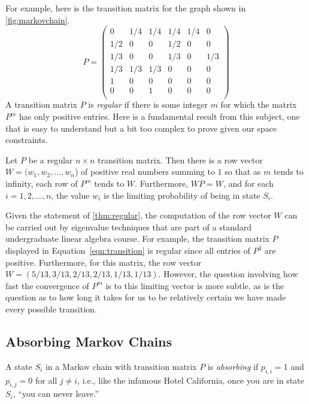 For example, here is the transition matrix for the graph shown in
\autoref{fig:markovchain}.
\begin{equation}\label{eqn:transition}
P =\begin{pmatrix}
      0 & 1/4 & 1/4 & 1/4 & 1/4 &   0 \\
    1/2 &   0 &   0 & 1/2 &   0 &   0 \\
    1/3 &   0 &   0 & 1/3 &   0 & 1/3 \\
    1/3 & 1/3 & 1/3 &   0 &   0 &   0 \\
      1 &   0 &   0 &   0 &   0 &   0 \\
      0 &   0 &   1 &   0 &   0 &   0 \\
   \end{pmatrix}
\end{equation} 
A transition matrix $P$ is \textit{regular} if there is some integer $m$
for which the matrix $P^m$ has only positive entries.  Here is a
fundamental result from this subject, one that is easy to understand
but a bit too complex to prove given our space constraints.

\begin{theorem}\label{thm:regular}
Let $P$ be a regular $n\times n$ transition matrix.  Then 
there is a row vector $W=(w_1, w_2,\dots,w_n$) of positive real
numbers summing to $1$ so that as $m$ tends to infinity, each 
row of $P^m$ tends to $W$.  Furthermore, $WP=W$, and for each
$i=1,2,\dots,n$, the value $w_i$ is the limiting probability of 
being in state $S_i$.
\end{theorem}

Given the statement of \autoref{thm:regular}, the computation of
the row vector $W$ can be carried out by eigenvalue
techniques that are part of a standard undergraduate linear
algebra course.  For example, the transition matrix $P$ displayed in 
Equation~\ref{eqn:transition} is regular since all entries of 
$P^3$ are positive.  Furthermore, for this matrix, the row vector 
$W=(5/13, 3/13, 2/13, 2/13, 1/13, 1/13)$.  However, the question involving how fast
the convergence of $P^m$ is to this limiting vector is more
subtle, as is the question as to how long it takes for us to
be relatively certain we have made every possible transition.

\subsection{Absorbing Markov Chains}
 
A state $S_i$ in a Markov chain with transition matrix $P$ is \textit{absorbing} 
if $p_{i,i}=1$ and $p_{i,j}=0$ for all $j\neq i$, i.e., like the infamous
Hotel California, once you are in state $S_i$, ``you can never leave.''

